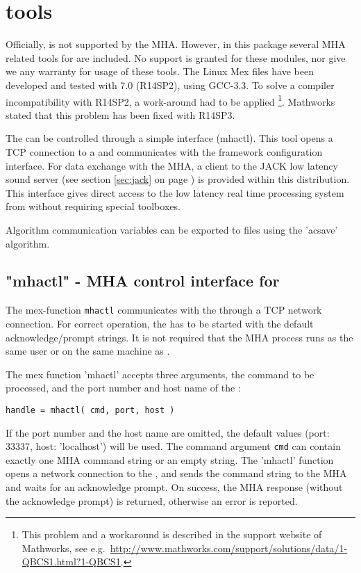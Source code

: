 \section{\Matlab{} tools}%
\label{sec:matlab}%

Officially, \Matlab{} is not supported by the MHA.
%
However, in this
package several MHA related tools for \Matlab{} are included.
%
No support
is granted for these modules, nor give we any warranty for usage of
these tools.
%
The Linux Mex files have been developed and tested with \Matlab{} 7.0
(R14SP2), using GCC-3.3.
%
To solve a compiler incompatibility with \Matlab{} R14SP2, a
work-around had to be applied%
\footnote{%
%
This problem and a workaround is described in the support website of
Mathworks, see e.g.\
\url{http://www.mathworks.com/support/solutions/data/1-QBCS1.html?1-QBCS1}.
%
}.
%
Mathworks stated that this problem has been fixed with \Matlab{} R14SP3.


The \mhad{} can be controlled through a simple \Matlab{}
interface (mhactl). This tool opens a TCP connection to a \mhad{} and
communicates with the framework configuration interface.
%
For data exchange with the MHA, a \Matlab{} client to the JACK low
latency sound server (see section \ref{sec:jack} on page
\pageref{sec:jack}) is provided within this distribution.
%
This interface gives direct access to the low latency real time
processing system from \Matlab{} without requiring special toolboxes.

Algorithm communication variables can be exported to \Matlab{} files
using the 'acsave' algorithm.

\subsection{"mhactl" - MHA control interface for \Matlab{}}
\label{sec:mhactl}

The \Matlab{} mex-function \verb!mhactl! communicates with the \mhad{}
through a TCP network connection.
%
For correct operation, the \mhad{} has to be started with the
default acknowledge/prompt strings.
%
It is not required that the MHA process runs as the same user or on
the same machine as \Matlab{}.

The mex function 'mhactl' accepts three arguments, the command to be
processed, and the port number and host name of the \mhad{}:
\begin{verbatim}handle = mhactl( cmd, port, host )\end{verbatim}
If the port number and the host name are omitted, the default values
(port: 33337, host: 'localhost') will be used. The command argument
\verb!cmd! can contain exactly one MHA command string or an empty
string.
%
The 'mhactl' function opens a network connection to the \mhad{},
and sends the command string to the MHA and waits for an acknowledge
prompt.
%
On success, the MHA response (without the acknowledge prompt) is
returned, otherwise an error is reported.

